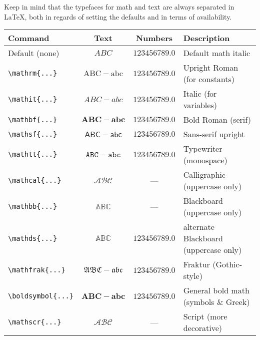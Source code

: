     Keep in mind that the typefaces for math and text are always separated in \LaTeX{}, both in regards of setting the defaults and in terms of availability.

    \begin{center}
        \small
        \begin{tabular}{lccl}
            \toprule
            \textbf{Command}        & \textbf{Text}          & \textbf{Numbers}           & \textbf{Description}                     \\ \midrule
            Default (none)          & $ABC$                  & $123456789.0$              & Default math italic                      \\
            \verb|\mathrm{...}|     & $\mathrm{ABC-abc}$     & $\mathrm{123456789.0}$     & Upright Roman (for constants)                    \\
            \verb|\mathit{...}|     & $\mathit{ABC-abc}$     & $\mathit{123456789.0}$     & Italic (for variables)         \\
            \verb|\mathbf{...}|     & $\mathbf{ABC-abc}$     & $\mathbf{123456789.0}$     & Bold Roman (serif)                       \\
            \verb|\mathsf{...}|     & $\mathsf{ABC-abc}$     & $\mathsf{123456789.0}$     & Sans-serif upright                       \\
            \verb|\mathtt{...}|     & $\mathtt{ABC-abc}$     & $\mathtt{123456789.0}$     & Typewriter (monospace)                   \\
            \verb|\mathcal{...}|    & $\mathcal{ABC}$        & ---                        & Calligraphic (uppercase only)            \\
            \verb|\mathbb{...}|     & $\mathbb{ABC}$         & ---                        & Blackboard (uppercase only)              \\
            \verb|\mathds{...}|     & $\mathds{ABC}$         & $\mathds{123456789.0}$     & alternate Blackboard (uppercase only)    \\
            \verb|\mathfrak{...}|   & $\mathfrak{ABC-abc}$   & $\mathfrak{123456789.0}$   & Fraktur (Gothic-style)                   \\
            \verb|\boldsymbol{...}| & $\boldsymbol{ABC-abc}$ & $\boldsymbol{123456789.0}$ & General bold math (symbols \& Greek) \\
            \verb|\mathscr{...}|    & $\mathscr{ABC}$        & ---                        & Script (more decorative)    \\ \bottomrule
        \end{tabular}
    \end{center}



